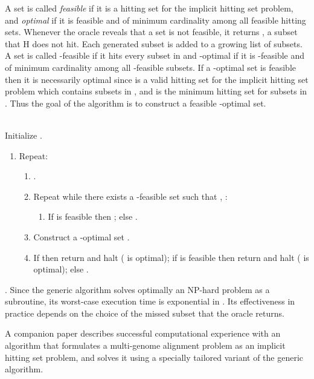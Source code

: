 \documentclass[11pt]{article}
\begin{document}
A set  is called {\it feasible} if it is a hitting set for the
implicit hitting set problem, and {\it optimal} if it is feasible and of
minimum cardinality among all feasible  hitting sets. Whenever the  oracle reveals
that a set  is not feasible, it returns  , a subset that H does not
hit. Each generated subset  is added to a growing list
 of subsets. A set  is called -feasible if it hits every
subset in  and -optimal if it is -feasible and of
minimum cardinality among all -feasible subsets. If a -optimal set 
is feasible then it is necessarily optimal since  is a valid hitting set for the implicit hitting set problem which contains subsets in , and  is the minimum hitting set for subsets in . Thus the goal of the algorithm is to construct a feasible -optimal set. 

\\
\noindent Initialize .
\begin{enumerate}
\item Repeat:
\begin{enumerate}
\item .
\item Repeat while there exists a -feasible set  such that , :
	\begin{enumerate}
	\item If  is feasible then ; else .
	\end{enumerate}
\item Construct a -optimal set .
\item If  then return  and halt ( is optimal); if  is feasible then return  and halt ( is optimal); else .
\end{enumerate}
\end{enumerate}

. Since the generic algorithm solves optimally an NP-hard problem as a subroutine, its worst-case execution time is exponential in . Its effectiveness in practice depends on the choice of the missed subset that the oracle returns.

A companion paper \cite{km} describes successful computational experience with
an algorithm that formulates a multi-genome alignment problem as an implicit
hitting set problem, and solves it using a specially tailored variant of the 
generic algorithm.
\end{document}
